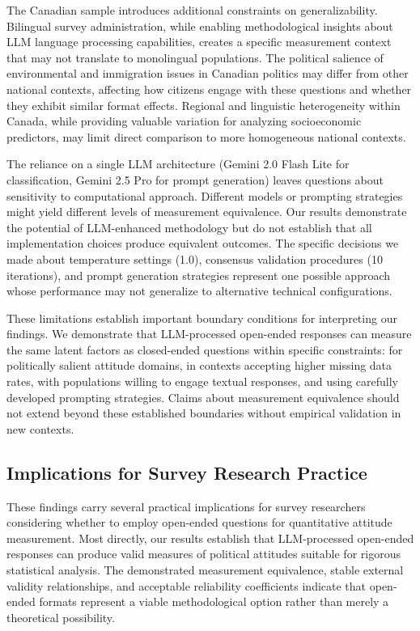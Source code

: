 \documentclass[
  journal=ram,
  manuscript=article-type,
  year=2025,
  volume=unpublished,
]{cup-journal}
\begin{document}
The Canadian sample introduces additional constraints on generalizability.
Bilingual survey administration, while enabling methodological insights about LLM language processing capabilities, creates a specific measurement context that may not translate to monolingual populations.
The political salience of environmental and immigration issues in Canadian politics may differ from other national contexts, affecting how citizens engage with these questions and whether they exhibit similar format effects.
Regional and linguistic heterogeneity within Canada, while providing valuable variation for analyzing socioeconomic predictors, may limit direct comparison to more homogeneous national contexts.

The reliance on a single LLM architecture (Gemini 2.0 Flash Lite for classification, Gemini 2.5 Pro for prompt generation) leaves questions about sensitivity to computational approach.
Different models or prompting strategies might yield different levels of measurement equivalence.
Our results demonstrate the potential of LLM-enhanced methodology but do not establish that all implementation choices produce equivalent outcomes.
The specific decisions we made about temperature settings (1.0), consensus validation procedures (10 iterations), and prompt generation strategies represent one possible approach whose performance may not generalize to alternative technical configurations.

These limitations establish important boundary conditions for interpreting our findings.
We demonstrate that LLM-processed open-ended responses can measure the same latent factors as closed-ended questions within specific constraints: for politically salient attitude domains, in contexts accepting higher missing data rates, with populations willing to engage textual responses, and using carefully developed prompting strategies.
Claims about measurement equivalence should not extend beyond these established boundaries without empirical validation in new contexts.

\subsection{Implications for Survey Research Practice}

These findings carry several practical implications for survey researchers considering whether to employ open-ended questions for quantitative attitude measurement.
Most directly, our results establish that LLM-processed open-ended responses can produce valid measures of political attitudes suitable for rigorous statistical analysis.
The demonstrated measurement equivalence, stable external validity relationships, and acceptable reliability coefficients indicate that open-ended formats represent a viable methodological option rather than merely a theoretical possibility.
\end{document}
